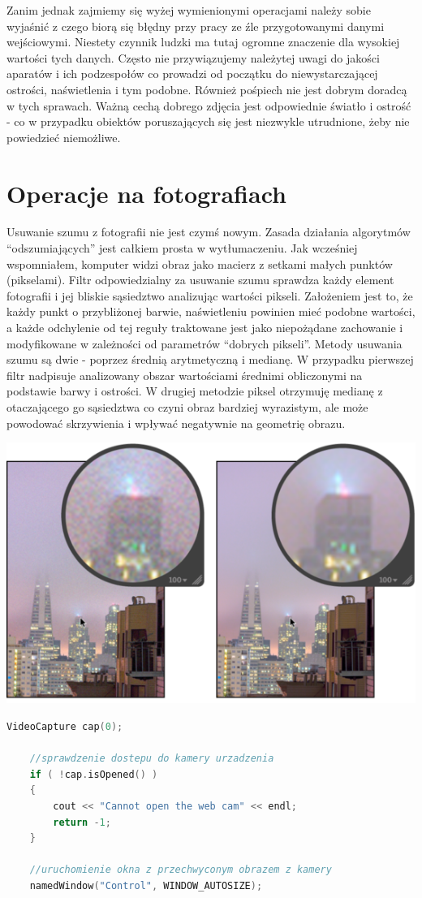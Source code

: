 \documentclass{article}
\begin{document}
Zanim jednak zajmiemy się wyżej wymienionymi operacjami należy sobie wyjaśnić z czego biorą się błędny przy pracy ze źle przygotowanymi danymi wejściowymi. Niestety czynnik ludzki ma tutaj ogromne znaczenie dla wysokiej wartości tych danych. Często nie przywiązujemy należytej uwagi do jakości aparatów i ich podzespołów co prowadzi od początku do niewystarczającej ostrości, naświetlenia i tym podobne. Również pośpiech nie jest dobrym doradcą w tych sprawach. Ważną cechą dobrego zdjęcia jest odpowiednie światło i ostrość - co w przypadku obiektów poruszających się jest niezwykle utrudnione, żeby nie powiedzieć niemożliwe. 
\section*{\textbf{Operacje na fotografiach}}
Usuwanie szumu z fotografii nie jest czymś nowym. Zasada działania algorytmów “odszumiających” jest całkiem prosta w wytłumaczeniu. Jak wcześniej wspomniałem, komputer widzi obraz jako macierz z setkami małych punktów (pikselami). Filtr odpowiedzialny za usuwanie szumu sprawdza każdy element fotografii i jej bliskie sąsiedztwo analizując wartości pikseli. Założeniem jest to, że każdy punkt o przybliżonej barwie, naświetleniu powinien mieć podobne wartości, a każde odchylenie od tej reguły traktowane jest jako niepożądane zachowanie i modyfikowane w zależności od parametrów “dobrych pikseli”. Metody usuwania szumu są dwie - poprzez średnią arytmetyczną i medianę. W przypadku pierwszej filtr nadpisuje analizowany obszar wartościami średnimi obliczonymi na podstawie barwy i ostrości. W drugiej metodzie piksel otrzymuję medianę z otaczającego go sąsiedztwa co czyni obraz bardziej wyrazistym, ale może powodować skrzywienia i wpływać negatywnie na geometrię obrazu.
\begin{center}
\includegraphics[width=15cm]{szum}
\end{center}
\newpage
\begin{lstlisting}[language=C++, caption=Początek wywołania]
	VideoCapture cap(0);
	
	//sprawdzenie dostepu do kamery urzadzenia
	if ( !cap.isOpened() )
	{
		cout << "Cannot open the web cam" << endl;
		return -1;
	}
	
	//uruchomienie okna z przechwyconym obrazem z kamery
	namedWindow("Control", WINDOW_AUTOSIZE);
\end{lstlisting}
\end{document}
